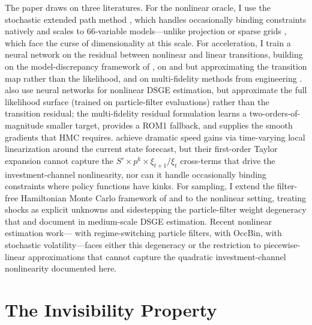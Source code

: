 \documentclass[12pt]{article}
\theoremstyle{plain}
\theoremstyle{definition}
\theoremstyle{remark}
\begin{document}
The paper draws on three literatures. For the nonlinear oracle, I use the stochastic extended path method \citep{fair1983solution,adjemian2025stochastic}, which handles occasionally binding constraints natively and scales to 66-variable models---unlike projection \citep{judd1992projection} or sparse grids \citep{krueger2004computing,winschel2010solving}, which face the curse of dimensionality at this scale. For acceleration, I train a neural network on the residual between nonlinear and linear transitions, building on the model-discrepancy framework of \citet{kennedy2001bayesian}, on \citet{koop2022bayesian} and \citet{naubert2025differentiable} but approximating the transition map rather than the likelihood, and on multi-fidelity methods from engineering \citep{peherstorfer2018survey}. \citet{kase2025estimating} also use neural networks for nonlinear DSGE estimation, but approximate the full likelihood surface (trained on particle-filter evaluations) rather than the transition residual; the multi-fidelity residual formulation learns a two-orders-of-magnitude smaller target, provides a ROM1 fallback, and supplies the smooth gradients that HMC requires. \citet{janssens2025efficient} achieve dramatic speed gains via time-varying local linearization around the current state forecast, but their first-order Taylor expansion cannot capture the $S' \times p^k \times \xi_{t+1}/\xi_t$ cross-terms that drive the investment-channel nonlinearity, nor can it handle occasionally binding constraints where policy functions have kinks. For sampling, I extend the filter-free Hamiltonian Monte Carlo framework of \citet{childers2022filter} and \citet{farkas2020bayesian} to the nonlinear setting, treating shocks as explicit unknowns and sidestepping the particle-filter weight degeneracy that \citet{herbst2019tempered} and \citet{cubaborda2019likelihood} document in medium-scale DSGE estimation. Recent nonlinear estimation work---\citet{gust2012effects} with regime-switching particle filters, \citet{boehl2022monetary} with OccBin, \citet{fernandezvillaverde2021estimating} with stochastic volatility---faces either this degeneracy or the restriction to piecewise-linear approximations that cannot capture the quadratic investment-channel nonlinearity documented here.


\section{The Invisibility Property}
\label{sec:invisibility}
\end{document}
